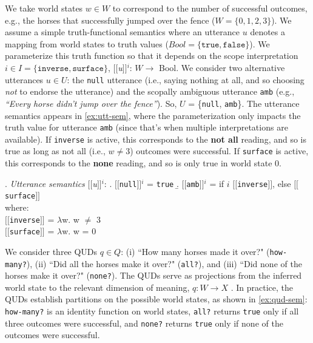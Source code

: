 \documentclass[10pt,a4paper]{article}
\newcommand{\sem}[1]{\mbox{$[\![$#1$]\!]$}}
\begin{document}
We take world states $w\in W$ 
to correspond to the number of successful outcomes, e.g., the horses that successfully jumped over the fence ($W=\{0,1,2,3\}$). We assume a simple truth-functional semantics where an utterance $u$ denotes a mapping from world states to truth values ($Bool = \{\texttt{true},\texttt{false}\}$). We parameterize this truth function so that it depends on the scope interpretation $i \in I = \{\texttt{inverse}, \texttt{surface}\}$,
\sem{\textit{u}}$^{i}$: $W\rightarrow$ Bool. 
We consider two alternative utterances $u \in U$: the \texttt{null} utterance (i.e., saying nothing at all, and so choosing \emph{not} to endorse the utterance) and the scopally ambiguous utterance \texttt{amb} (e.g., \textit{``Every horse didn't jump over the fence''}). So, $U$ = \{\texttt{null}, \texttt{amb}\}.  
The utterance semantics appears in \ref{ex:utt-sem},
where the parameterization only impacts the truth value for utterance \texttt{amb} (since that's when multiple interpretations are available). 
If \texttt{inverse} is active, this corresponds to the  \textbf{not all} reading, and so is true as long as not all (i.e., $w$$\neq$3) outcomes were successful.
If  \texttt{surface} is active, this corresponds to the \textbf{none} reading, and so is only true in world state 0.


\ex. \label{ex:utt-sem} \emph{Utterance semantics} \sem{\textit{u}}$^{i}$:
\a. \sem{\texttt{null}}$^{i}$ = \texttt{true}
\b. \sem{\texttt{amb}}$^{i}$ = if $i$ \sem{\texttt{inverse}}, else \sem{\texttt{surface}}\\
where:\\
\sem{\texttt{inverse}} = $\lambda$w. w $\neq$ 3 \\
\sem{\texttt{surface}} = $\lambda$w. w = 0


We consider three QUDs $q \in Q$: 
(i) ``How many horses made it over?" (\texttt{how-many?}), 
(ii) ``Did all the horses make it over?" (\texttt{all?}), and 
(iii) ``Did none of the horses make it over?" (\texttt{none?}). 
The QUDs serve as projections from the inferred world state to the relevant dimension of meaning, $q: W \rightarrow X$ . 
In practice, the QUDs establish partitions on the possible world states, as shown in \ref{ex:qud-sem}: 
\texttt{how-many?} is an identity function on world states, 
\texttt{all?} returns \texttt{true} only if  all three outcomes were successful, and 
\texttt{none?} returns \texttt{true} only if none of the outcomes were successful.
\end{document}
